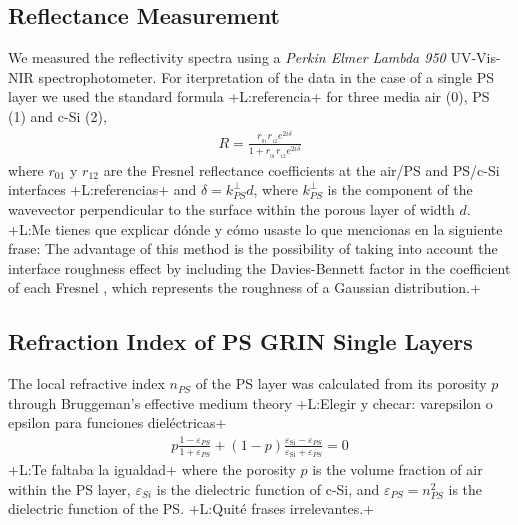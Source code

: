\documentclass{article}
\newcommand{\notaL}[1]{{\color{blue}+L:#1+}}
\begin{document}
\subsection{Reflectance Measurement}
\label{sec:refl-meas}
We measured the reflectivity spectra using a {\em Perkin Elmer Lambda 950}
UV-Vis-NIR spectrophotometer. For iterpretation of the data in the
case of a single PS layer we used
the standard formula \notaL{referencia} for three media air (0), PS
(1) and c-Si (2),
 \begin{eqnarray}\label{Eq:ECMR}
   R=\frac{r _ {_ {01}}r _ {_ {12}} e^{2i\delta}}{1+r _ {_ {01}}r _ {_ {12}} e^{2i\delta}}
\end{eqnarray}
where $ r_{01} $ y $ r_{12}$ are the Fresnel reflectance
coefficients at the air/PS and PS/c-Si interfaces \notaL{referencias}
and $\delta=k_{PS}^\perp d$, where $k_{PS}^\perp$ is
the component of the wavevector perpendicular to the surface within
the porous layer of width $d$.
\notaL{Me tienes que explicar dónde y cómo usaste lo que mencionas en
  la siguiente frase:
The advantage of this method is
the possibility of taking into account the interface roughness effect
by including the Davies-Bennett factor in the coefficient of each
Fresnel \cite{I17, I18, I19}, which represents the roughness of a
Gaussian distribution.}

\subsection{Refraction Index of PS GRIN Single Layers}
\label{sec:refraction-index-ps}
The local refractive index $n_{PS}$ of the PS layer was calculated from its
porosity $p$ through
Bruggeman's effective medium theory \cite{I20} \notaL{Elegir y checar:
  varepsilon o epsilon para funciones dieléctricas}
\begin{eqnarray}\label{Eq:Brugg}
 p\frac{1-\varepsilon_{PS}} {1+\varepsilon_{PS}} + (1-p)
  \frac{\varepsilon_{\text{Si}} - \varepsilon_{PS}}
  {\varepsilon_{\text{Si}}+\varepsilon_{PS}}=0
\end{eqnarray}
\notaL{Te faltaba la igualdad}
where the porosity $p$ is the volume fraction of air within the PS
layer, $\varepsilon_{Si}$ is the dielectric function of c-Si, and
$\varepsilon_{PS}=n_{PS}^2$ is the dielectric function of the PS.
\notaL{Quité frases irrelevantes.}
\end{document}
